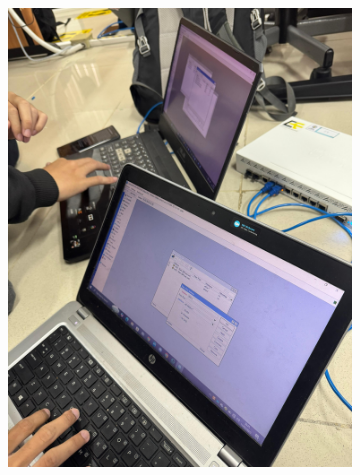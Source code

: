 \begin{figure}[H]
	\centering
	\begin{subfigure}[b]{0.4\linewidth}
		\centering
		\includegraphics[width=\linewidth]{P2/img/dokum (3).jpg}
	\end{subfigure}
	\begin{subfigure}[b]{0.4\linewidth}
		\centering

\end{subfigure}
\end{figure}
